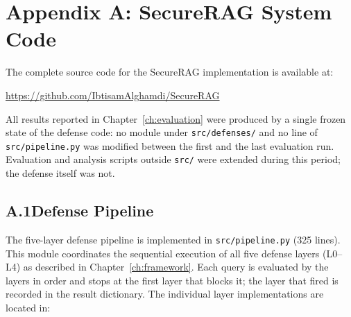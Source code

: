 %
%

\chapter*{Appendix A: SecureRAG System Code}
\label{app:code}

The complete source code for the SecureRAG implementation is available at:

\begin{center}
	\url{https://github.com/IbtisamAlghamdi/SecureRAG}
\end{center}

\noindent
All results reported in Chapter~\ref{ch:evaluation} were produced by a single frozen state of the defense code: no module under \texttt{src/defenses/} and no line of \texttt{src/pipeline.py} was modified between the first and the last evaluation run. Evaluation and analysis scripts outside \texttt{src/} were extended during this period; the defense itself was not.

\section*{A.1\quad Defense Pipeline}

The five-layer defense pipeline is implemented in \texttt{src/pipeline.py} (325 lines). This module coordinates the sequential execution of all five defense layers (L0--L4) as described in Chapter~\ref{ch:framework}. Each query is evaluated by the layers in order and stops at the first layer that blocks it; the layer that fired is recorded in the result dictionary. The individual layer implementations are located in:

